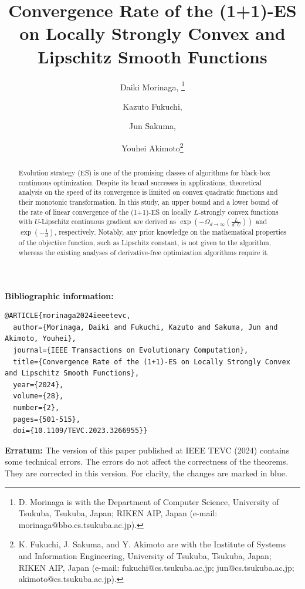 \documentclass[journal]{IEEEtran}
\theoremstyle{definition}
\begin{document}
\title{
Convergence Rate of the (1+1)-ES on Locally Strongly Convex and Lipschitz Smooth Functions
}%


\author{
Daiki Morinaga,
\thanks{D. Morinaga is with the Department of Computer Science, University of Tsukuba, Tsukuba, Japan; RIKEN AIP, Japan (e-mail: morinaga@bbo.cs.tsukuba.ac.jp).}
\and Kazuto Fukuchi,
\and Jun Sakuma,
\and Youhei Akimoto\thanks{
K. Fukuchi, J. Sakuma, and Y. Akimoto are with the Institute of Systems and Information Engineering, University of Tsukuba, Tsukuba, Japan; RIKEN AIP, Japan
(e-mail: fukuchi@cs.tsukuba.ac.jp; jun@cs.tsukuba.ac.jp; akimoto@cs.tsukuba.ac.jp).}
}




\thispagestyle{empty}
\noindent\textbf{Bibliographic information:}
{\small
\begin{verbatim}
@ARTICLE{morinaga2024ieeetevc,
  author={Morinaga, Daiki and Fukuchi, Kazuto and Sakuma, Jun and Akimoto, Youhei},
  journal={IEEE Transactions on Evolutionary Computation}, 
  title={Convergence Rate of the (1+1)-ES on Locally Strongly Convex and Lipschitz Smooth Functions}, 
  year={2024},
  volume={28},
  number={2},
  pages={501-515},
  doi={10.1109/TEVC.2023.3266955}}
\end{verbatim}
}

\noindent\textbf{Erratum:}
The version of this paper published at IEEE TEVC (2024) contains some technical errors. The errors do not affect the correctness
of the theorems. They are corrected in this version. For clarity, the changes are marked in {\color{blue}
blue}.


\maketitle
\setcounter{page}{1}
\begin{abstract}
Evolution strategy (ES) is one of the promising classes of algorithms for black-box continuous optimization.
Despite its broad successes in applications, 
theoretical analysis on the speed of its convergence is limited on convex quadratic functions and their monotonic transformation.%
In this study, an upper bound and a lower bound of the rate of linear convergence of the (1+1)-ES on locally $L$-strongly convex functions with $U$-Lipschitz continuous gradient are derived as $\exp\left(-\Omega_{d\to\infty}\left(\frac{L}{d\cdot U}\right)\right)$ and $\exp\left(-\frac1d\right)$, respectively.
Notably, any prior knowledge on the mathematical properties of the objective function, such as Lipschitz constant, is not given to the algorithm, whereas the existing analyses of derivative-free optimization algorithms require it.
\end{abstract}
\end{document}
